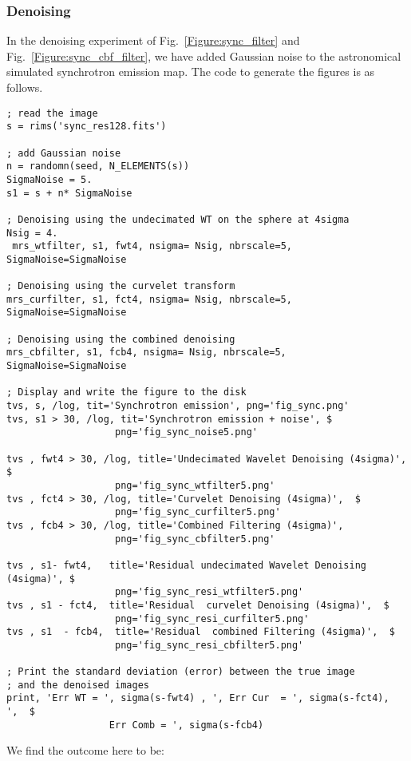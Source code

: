 \subsubsection{Denoising}
In the denoising experiment of Fig.~\ref {Figure:sync_filter} and Fig.~\ref{Figure:sync_cbf_filter}, 
we have added Gaussian noise to the astronomical simulated synchrotron emission map.
The code to generate the figures is as follows.
\begin{verbatim}
; read the image
s = rims('sync_res128.fits')

; add Gaussian noise
n = randomn(seed, N_ELEMENTS(s))
SigmaNoise = 5.
s1 = s + n* SigmaNoise
 
; Denoising using the undecimated WT on the sphere at 4sigma
Nsig = 4.
 mrs_wtfilter, s1, fwt4, nsigma= Nsig, nbrscale=5, SigmaNoise=SigmaNoise

; Denoising using the curvelet transform
mrs_curfilter, s1, fct4, nsigma= Nsig, nbrscale=5, SigmaNoise=SigmaNoise

; Denoising using the combined denoising
mrs_cbfilter, s1, fcb4, nsigma= Nsig, nbrscale=5, SigmaNoise=SigmaNoise

; Display and write the figure to the disk
tvs, s, /log, tit='Synchrotron emission', png='fig_sync.png'
tvs, s1 > 30, /log, tit='Synchrotron emission + noise', $
                   png='fig_sync_noise5.png'

tvs , fwt4 > 30, /log, title='Undecimated Wavelet Denoising (4sigma)', $
                   png='fig_sync_wtfilter5.png'
tvs , fct4 > 30, /log, title='Curvelet Denoising (4sigma)',  $
                   png='fig_sync_curfilter5.png'
tvs , fcb4 > 30, /log, title='Combined Filtering (4sigma)',  
                   png='fig_sync_cbfilter5.png'

tvs , s1- fwt4,   title='Residual undecimated Wavelet Denoising (4sigma)', $
                   png='fig_sync_resi_wtfilter5.png'
tvs , s1 - fct4,  title='Residual  curvelet Denoising (4sigma)',  $
                   png='fig_sync_resi_curfilter5.png'
tvs , s1  - fcb4,  title='Residual  combined Filtering (4sigma)',  $
                   png='fig_sync_resi_cbfilter5.png'

; Print the standard deviation (error) between the true image 
; and the denoised images
print, 'Err WT = ', sigma(s-fwt4) , ', Err Cur  = ', sigma(s-fct4),  ',  $
                  Err Comb = ', sigma(s-fcb4)

\end{verbatim}

We find the outcome here to be:

